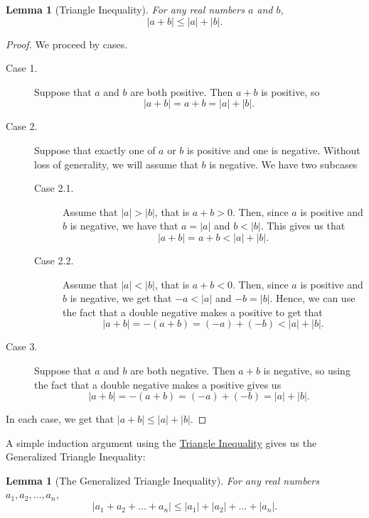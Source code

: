 \documentclass[11pt,oneside]{book}
\newtheorem{lem}[thm]{Lemma}
\theoremstyle{definition}
\begin{document}
\begin{lem}[Triangle Inequality] \label{lem:TriangleInequality}
    For any real numbers $a$ and $b$,
    \[ |a + b| \leq |a| + |b|. \]
\end{lem}
\begin{proof}
    We proceed by cases.
    \begin{description}
        \item[Case 1.] Suppose that $a$ and $b$ are both positive.
        Then $a + b$ is positive, so
        \[ |a + b| = a + b = |a| + |b|. \]

        \item[Case 2.] Suppose that exactly one of $a$ or $b$ is positive and one is negative.
        Without loss of generality, we will assume that $b$ is negative.
        We have two subcases
        \begin{description}
            \item[Case 2.1.] Assume that $|a| > |b|$, that is $a + b > 0$.
            Then, since $a$ is positive and $b$ is negative, we have that $a = |a|$ and $b < |b|$.
            This gives us that
            \[ |a + b| = a + b < |a| + |b|. \]

            \item[Case 2.2.] Assume that $|a| < |b|$, that is $a + b < 0$.
            Then, since $a$ is positive and $b$ is negative, we get that $-a < |a|$ and $-b = |b|$.
            Hence, we can use the fact that a double negative makes a positive to get that
            \[ |a + b| = -(a + b) = (-a) + (-b) < |a| + |b|. \]
        \end{description}

        \item[Case 3.] Suppose that $a$ and $b$ are both negative.
        Then $a + b$ is negative, so using the fact that a double negative makes a positive gives us
        \[ |a + b| = -(a + b) = (-a) + (-b) = |a| + |b|. \]

    \end{description}
    In each case, we get that $|a + b| \leq |a| + |b|$.
\end{proof}

A simple induction argument using the \hyperref[lem:TriangleInequality]{Triangle Inequality} gives us the Generalized Triangle Inequality:

\begin{lem}[The Generalized Triangle Inequality] \label{lem:GeneralizedTriangleInequality}
    For any real numbers $a_{1}, a_{2}, \dots, a_{n}$,
    \[ |a_{1} + a_{2} + \dots + a_{n}| \leq |a_{1}| + |a_{2}| + \dots + |a_{n}|. \]
\end{lem}
\end{document}
